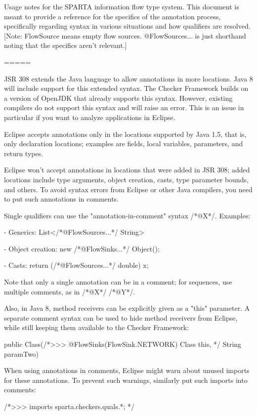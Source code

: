 Usage notes for the SPARTA information flow type system. This document
is meant to provide a reference for the specifics of the annotation
process, specifically regarding syntax in various situations and how
qualifiers are resolved. 
[Note: FlowSource{} means empty flow sources. @FlowSources... is
just shorthand noting that the specifics aren't relevant.]

=====

JSR 308 extends the Java language to allow annotations in more
locations. Java 8 will include support for this extended syntax.
The Checker Framework builds on a version of OpenJDK that already
supports this syntax.
However, existing compilers do not support this syntax and will raise
an error. This is an issue in particular if you want to analyze
applications in Eclipse.

Eclipse accepts annotations only in the locations supported by Java
1.5, that is, only declaration locations; examples are fields, local
variables, parameters, and return types.

Eclipse won't accept annotations in locations that were added in
JSR 308; added locations include type arguments, object creation,
casts, type parameter bounds, and others.
To avoid syntax errors from Eclipse or other Java compilers, you need
to put such annotations in comments.

Single qualifiers can use the "annotation-in-comment" syntax
/*@X*/. Examples:

- Generics:
	List</*@FlowSources...*/ String>

- Object creation:
	new /*@FlowSinks...*/ Object();

- Casts:
	return (/*@FlowSources...*/ double) x;

Note that only a single annotation can be in a comment; for
sequences, use multiple comments, as in /*@X*/ /*@Y*/.

Also, in Java 8, method receivers can be explicitly given as a "this"
parameter.
A separate comment syntax can be used to hide method receivers from
Eclipse, while still keeping them available to the Checker Framework:

	public Class(/*>>> @FlowSinks(FlowSink.NETWORK) Class this, */ String paramTwo) {}


When using annotations in comments, Eclipse might warn about unused
imports for these annotations. To prevent such warnings, similarly put
such imports into comments:

/*>>>
imports sparta.checkers.quals.*;
*/



